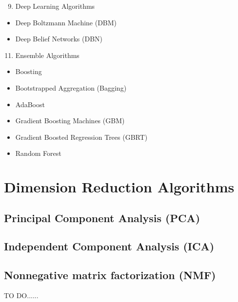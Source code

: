 \documentclass[letterpaper,11pt,english]{sphinxmanual}
\begin{document}
\begin{enumerate}
\setcounter{enumi}{8}
\item {} 
Deep Learning Algorithms

\end{enumerate}
\begin{itemize}
\item {} 
Deep Boltzmann Machine (DBM)

\item {} 
Deep Belief Networks (DBN)

\end{itemize}
\begin{enumerate}
\setcounter{enumi}{10}
\item {} 
Ensemble Algorithms

\end{enumerate}
\begin{itemize}
\item {} 
Boosting

\item {} 
Bootstrapped Aggregation (Bagging)

\item {} 
AdaBoost

\item {} 
Gradient Boosting Machines (GBM)

\item {} 
Gradient Boosted Regression Trees (GBRT)

\item {} 
Random Forest

\end{itemize}


\chapter{Dimension Reduction Algorithms}
\label{dim:dim}\label{dim::doc}\label{dim:dimension-reduction-algorithms}

\section{Principal Component Analysis (PCA)}
\label{dim:principal-component-analysis-pca}

\section{Independent Component Analysis (ICA)}
\label{dim:independent-component-analysis-ica}

\section{Nonnegative matrix factorization (NMF)}
\label{dim:nonnegative-matrix-factorization-nmf}
TO DO......
\end{document}

